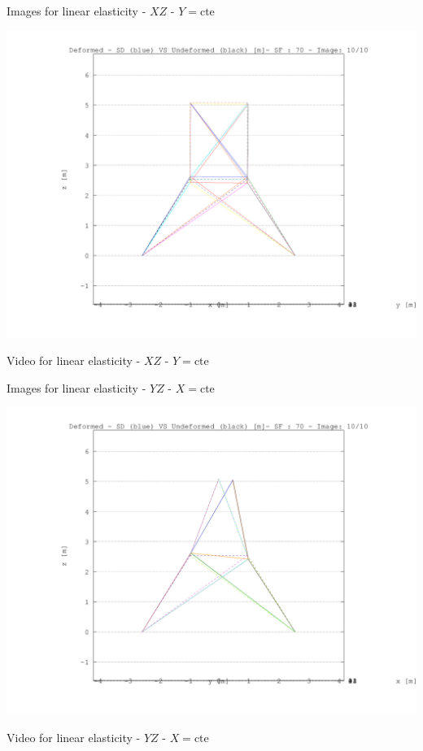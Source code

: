 \documentclass[a4paper,11pt]{article}
\begin{document}
\newpage       
\begin{center}       
Images for linear elasticity -  $XZ$ - $Y=\text{cte}$ 

\includegraphics[width=.80\textwidth]{../../XY_XZ_YZ/XZ/deformed/torre_deformed_XZ_10.png}      


Video for linear elasticity -  $XZ$ - $Y=\text{cte}$ 


\end{center}       
\newpage       
\begin{center}       
Images for linear elasticity -  $YZ$ - $X=\text{cte}$ 

\includegraphics[width=.80\textwidth]{../../XY_XZ_YZ/YZ/deformed/torre_deformed_YZ_10.png}      


Video for linear elasticity -  $YZ$ - $X=\text{cte}$ 


\end{center}       
\end{document}
